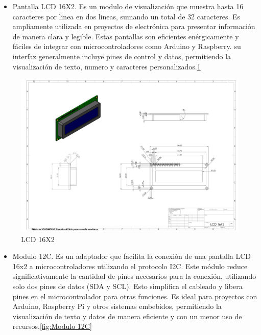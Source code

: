     \begin{itemize}
        \item 
        Pantalla LCD 16X2. Es un modulo de visualización que muestra hasta 16 caracteres por linea en dos lineas, sumando un total de 32 caracteres. Es ampliamente utilizada en proyectos de electrónica para presentar información de manera clara y legible. Estas pantallas son eficientes enérgicamente y fáciles de integrar con microcontroladores como Arduino y Raspberry. su interfaz generalmente incluye pines de control y datos, permitiendo la visualización de texto, numero y caracteres personalizados.\ref{fig:LCD 16X2}
    \end{itemize}
    \begin{figure}[H]
        \centering
       \includegraphics[trim = {10mm 10mm 10mm 10mm},clip,scale=0.120]{24/Img/LCD16X2.pdf}
        \caption{LCD 16X2}
        \label{fig:LCD 16X2}
    \end{figure}
    \begin{itemize}
        \item 
        Modulo 12C. Es un adaptador que facilita la conexión de una pantalla LCD 16x2 a microcontroladores utilizando el protocolo I2C. Este módulo reduce significativamente la cantidad de pines necesarios para la conexión, utilizando solo dos pines de datos (SDA y SCL). Esto simplifica el cableado y libera pines en el microcontrolador para otras funciones. Es ideal para proyectos con Arduino, Raspberry Pi y otros sistemas embebidos, permitiendo la visualización de texto y datos de manera eficiente y con un menor uso de recursos.\ref{fig:Modulo 12C}
    \end{itemize}
